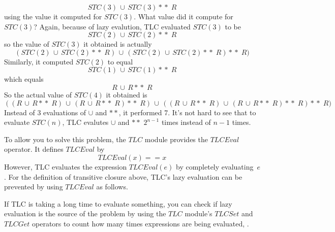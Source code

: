 \documentclass[fleqn,leqno]{article}
\begin{document}
 \[ STC(3) \,\cup\, STC(3) *\!*\; R \]
using the value it computed for $STC(3)$.  What value did it compute
for $STC(3)$?  Again, because of lazy evalution, TLC evaluated
$STC(3)$ to be
 \[ STC(2) \,\cup\, STC(2) *\!*\; R \]
so the value of $STC(3)$ it obtained is actually
 \[ (STC(2) \,\cup\, STC(2) *\!*\; R) \,\cup\, 
     (STC(2) \,\cup\, STC(2) *\!*\; R) *\!*\; R)\]
Similarly, it computed $STC(2)$ to equal 
 \[ STC(1) \,\cup\, STC(1) *\!*\; R \]
which equals
 \[ R \,\cup\, R *\!*\; R \]
So the actual value of $STC(4)$ it obtained is
 \[ ((R \,\cup\, R *\!*\; R) \,\cup\, (R \,\cup\, R *\!*\; R) *\!*\; R) \,\cup\, 
     ((R \,\cup\, R *\!*\; R) \,\cup\, (R \,\cup\, R *\!*\; R) *\!*\; R) *\!*\; R)\]
Instead of 3 evaluations of $\cup$ and $**$, it performed 7.  It's not
hard to see that to evaluate $STC(n)$, TLC evalutes $\cup$ and $**$
$2^{n-1}$ times instead of $n-1$ times.

To allow you to solve this problem, the $TLC$ module provides the
$TLCEval$ operator.  It defines $TLCEval$ by
 \[ TLCEval(x) == x\] 
However, TLC evaluates the expression $TLCEval(e)$ by completely
evaluating~$e$.  For the definition of transitive closure above,
TLC's lazy evaluation can be prevented by using $TLCEval$ as follows.
\begin{display}
\begin{tlatex}\gray
{}%
%
%
%
\end{tlatex}
\end{display}
If TLC is taking a long time to evaluate something, you can check if
lazy evaluation is the source of the problem by using the $TLC$
module's $TLCSet$ and $TLCGet$ operators to count how many times
expressions are being evaluated, .
\end{document}
